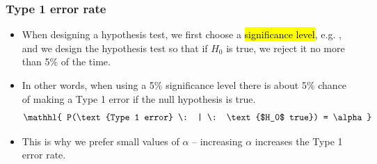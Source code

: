 \documentclass[t,compress,mathserif]{beamer}
\newcommand{\soln}[1]{\textit{#1}}
\begin{document}





\begin{frame}
\frametitle{Type 1 error rate}

\begin{itemize}

\item When designing a hypothesis test, we first choose a \hl{significance level}, e.g. , and we design the hypothesis test so that if $H_0$ is true, we reject it no more than 5\% of the time.

\pause

\item In other words, when using a 5\% significance level there is about 5\% chance of making a Type 1 error if the null hypothesis is true.
\[ \mathhl{ P(\text{Type 1 error} \: | \: \text{$H_0$ true}) = \alpha } \]

\pause

\item This is why we prefer small values of $\alpha$ -- increasing $\alpha$ increases the Type 1 error rate.

\end{itemize}

\end{frame}
\end{document}

